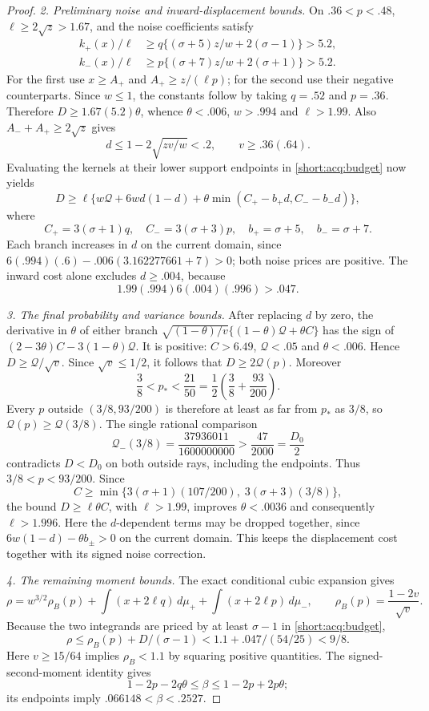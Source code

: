 \begin{proof}
\emph{2. Preliminary noise and inward-displacement bounds.}
On $.36<p<.48$, $\ell\ge2\sqrt z>1.67$, and the noise coefficients satisfy
\begin{align*}
 k_+(x)/\ell&\ge q\{(\sigma+5)z/w+2(\sigma-1)\}>5.2,\\
 k_-(x)/\ell&\ge p\{(\sigma+7)z/w+2(\sigma+1)\}>5.2.
\end{align*}
For the first use $x\ge A_+$ and $A_+\ge z/(\ell p)$; for the second
use their negative counterparts. Since $w\le1$, the constants follow
by taking $q=.52$ and $p=.36$. Therefore
$D\ge1.67(5.2)\theta$, whence $\theta<.006$, $w>.994$ and
$\ell>1.99$. Also $A_-+A_+\ge2\sqrt z$ gives
\[
 d\le1-2\sqrt{zv/w}<.2,\qquad v\ge.36(.64).
\]
Evaluating the kernels at their lower support endpoints in
\eqref{short:acq:budget} now yields
\begin{equation}\label{short:acq:direct}
 D\ge\ell\{w\mathcal Q+6wd(1-d)
            +\theta\min(C_+-b_+d,C_--b_-d)\},
\end{equation}
where
\[
 C_+=3(\sigma+1)q,\quad C_-=3(\sigma+3)p,\quad
 b_+=\sigma+5,\quad b_-=\sigma+7.
\]
Each branch increases in $d$ on the current domain, since
$6(.994)(.6)-.006(3.162277661+7)>0$; both noise prices are positive.
The inward cost alone excludes $d\ge.004$, because
\[
 1.99(.994)6(.004)(.996)>.047.
\]

\emph{3. The final probability and variance bounds.}
After replacing $d$ by zero, the derivative in $\theta$ of either branch
$\sqrt{(1-\theta)/v}\{(1-\theta)\mathcal Q+\theta C\}$ has the sign of
$(2-3\theta)C-3(1-\theta)\mathcal Q$. It is positive: $C>6.49$, $\mathcal Q<.05$
and $\theta<.006$. Hence $D\ge\mathcal Q/\sqrt v$.
Since $\sqrt v\le1/2$, it follows that $D\ge2\mathcal Q(p)$.
Moreover
\[
 \frac38<p_*<\frac{21}{50}
      =\frac12\left(\frac38+\frac{93}{200}\right).
\]
Every $p$ outside $(3/8,93/200)$ is therefore at least as far from
$p_*$ as $3/8$, so $\mathcal Q(p)\ge \mathcal Q(3/8)$. The single rational comparison
\[
 \mathcal Q_-(3/8)=\frac{37936011}{1600000000}
       >\frac{47}{2000}=\frac{D_0}{2}
\]
contradicts $D<D_0$ on both outside rays, including the endpoints.
Thus $3/8<p<93/200$.
Since
\[
 C\ge\min\{3(\sigma+1)(107/200),\;3(\sigma+3)(3/8)\},
\]
the bound $D\ge\ell\theta C$, with $\ell>1.99$, improves
$\theta<.0036$ and consequently $\ell>1.996$.
Here the $d$-dependent terms may be dropped together, since
$6w(1-d)-\theta b_\pm>0$ on the current domain. This keeps the displacement cost together with its signed noise correction.

\emph{4. The remaining moment bounds.} The exact conditional cubic expansion gives
\[
 \rho=w^{3/2}\rho_B(p)+\int(x+2\ell q)\,d\mu_+
                          +\int(x+2\ell p)\,d\mu_-,
 \qquad\rho_B(p)=\frac{1-2v}{\sqrt v}.
\]
Because the two integrands are priced by at least $\sigma-1$ in
\eqref{short:acq:budget},
\[
 \rho\le\rho_B(p)+D/(\sigma-1)
       <1.1+.047/(54/25)<9/8.
\]
Here $v\ge15/64$ implies $\rho_B<1.1$ by squaring positive quantities.
The signed-second-moment identity gives
\[
 1-2p-2q\theta\le\beta\le1-2p+2p\theta;
\]
its endpoints imply $.066148<\beta<.2527$.


\end{proof}
